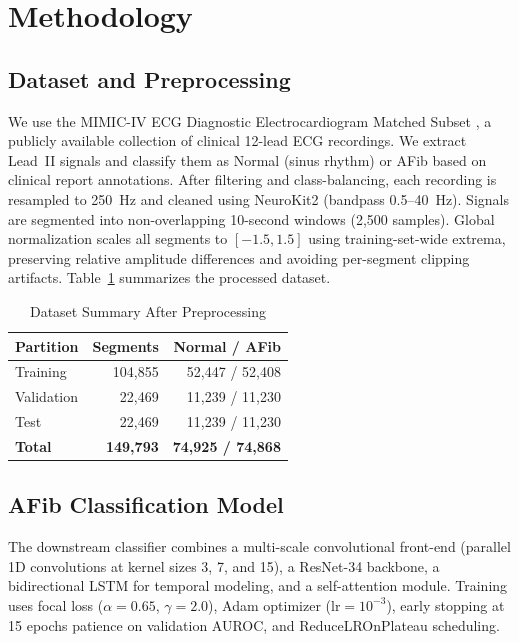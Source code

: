 \documentclass[conference]{IEEEtran}
\begin{document}
\section{Methodology}

\subsection{Dataset and Preprocessing}

We use the MIMIC-IV ECG Diagnostic Electrocardiogram Matched Subset \cite{mimiciv_ecg}, a publicly available collection of clinical 12-lead ECG recordings. We extract Lead~II signals and classify them as Normal (sinus rhythm) or AFib based on clinical report annotations. After filtering and class-balancing, each recording is resampled to 250~Hz and cleaned using NeuroKit2 (bandpass 0.5--40~Hz). Signals are segmented into non-overlapping 10-second windows (2,500 samples). Global normalization scales all segments to $[-1.5, 1.5]$ using training-set-wide extrema, preserving relative amplitude differences and avoiding per-segment clipping artifacts. Table~\ref{tab:dataset} summarizes the processed dataset.

\begin{table}[t]
\centering
\caption{Dataset Summary After Preprocessing}
\label{tab:dataset}
\begin{tabular}{lrr}
\toprule
\textbf{Partition} & \textbf{Segments} & \textbf{Normal / AFib} \\
\midrule
Training   & 104,855 & 52,447 / 52,408 \\
Validation &  22,469 & 11,239 / 11,230 \\
Test       &  22,469 & 11,239 / 11,230 \\
\midrule
\textbf{Total} & \textbf{149,793} & \textbf{74,925 / 74,868} \\
\bottomrule
\end{tabular}
\end{table}

\subsection{AFib Classification Model}

The downstream classifier combines a multi-scale convolutional front-end (parallel 1D convolutions at kernel sizes 3, 7, and 15), a ResNet-34 backbone, a bidirectional LSTM for temporal modeling, and a self-attention module. Training uses focal loss ($\alpha{=}0.65$, $\gamma{=}2.0$), Adam optimizer (lr$=10^{-3}$), early stopping at 15 epochs patience on validation AUROC, and ReduceLROnPlateau scheduling.
\end{document}
